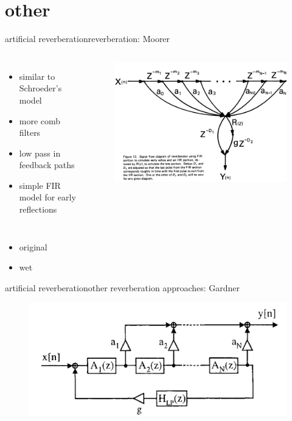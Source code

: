 \section{other}
\begin{frame}{artificial reverberation}{reverberation: Moorer}
    \vspace{-5mm}
    \begin{columns}
	\begin{itemize}
		\item	similar to Schroeder's model
		\item	more comb filters
		\item	low pass in feedback paths
		\item	simple FIR model for early reflections
	\end{itemize}
        \begin{figure}
            \includegraphics[scale=.3]{graph/moorer}
        \end{figure}
    \end{columns}
    \begin{itemize}
        \item   original 
        \item   wet 
    \end{itemize}
\end{frame}

\begin{frame}{artificial reverberation}{other reverberation approaches: Gardner}
	\begin{figure}
		\centerline{\includegraphics[scale=.4]{graph/gardnerreverb}}
	\end{figure} 
\end{frame}


